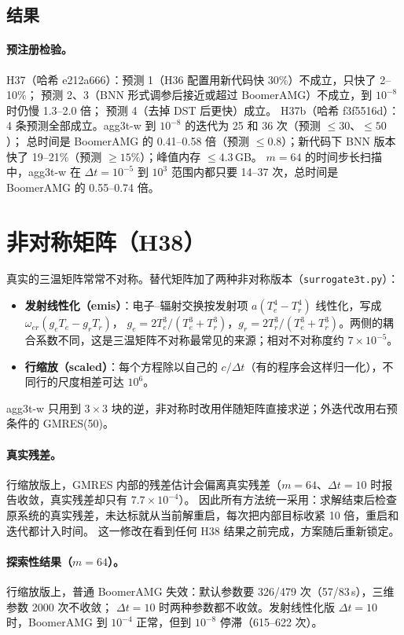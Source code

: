 \documentclass[11pt,a4paper]{ctexart}
\begin{document}
\subsection{结果}

\paragraph{预注册检验。}
H37（哈希 e212a666）：预测 1（H36 配置用新代码快 30\%）不成立，只快了 2--10\%；
预测 2、3（BNN 形式调参后接近或超过 BoomerAMG）不成立，到 $10^{-8}$ 时仍慢 1.3--2.0 倍；
预测 4（去掉 DST 后更快）成立。
H37b（哈希 f3f5516d）：4 条预测全部成立。agg3t-w 到 $10^{-8}$ 的迭代为 25 和 36 次（预测 $\le30$、$\le50$）；
总时间是 BoomerAMG 的 0.41--0.58 倍（预测 $\le0.8$）；新代码下 BNN 版本快了 19--21\%（预测 $\ge15\%$）；峰值内存 $\le4.3$\,GB。
$m=64$ 的时间步长扫描中，agg3t-w 在 $\Delta t=10^{-5}$ 到 $10^{3}$ 范围内都只要 14--37 次，总时间是 BoomerAMG 的 0.55--0.74 倍。

\section{非对称矩阵（H38）}
真实的三温矩阵常常不对称。替代矩阵加了两种非对称版本（\texttt{surrogate3t.py}）：
\begin{itemize}
\item \textbf{发射线性化（emis）}：电子--辐射交换按发射项 $a(T_e^4-T_r^4)$ 线性化，写成 $\omega_{er}(g_eT_e-g_rT_r)$，
$g_e=2T_e^3/(T_e^3+T_r^3)$，$g_r=2T_r^3/(T_e^3+T_r^3)$。两侧的耦合系数不同，这是三温矩阵不对称最常见的来源；相对不对称度约 $7\times10^{-5}$。
\item \textbf{行缩放（scaled）}：每个方程除以自己的 $c/\Delta t$（有的程序会这样归一化），不同行的尺度相差可达 $10^6$。
\end{itemize}
agg3t-w 只用到 $3\times3$ 块的逆，非对称时改用伴随矩阵直接求逆；外迭代改用右预条件的 GMRES(50)。

\paragraph{真实残差。}行缩放版上，GMRES 内部的残差估计会偏离真实残差（$m=64$、$\Delta t=10$ 时报告收敛，真实残差却只有 $7.7\times10^{-4}$）。
因此所有方法统一采用：求解结束后检查原系统的真实残差，未达标就从当前解重启，每次把内部目标收紧 10 倍，重启和迭代都计入时间。
这一修改在看到任何 H38 结果之前完成，方案随后重新锁定。

\paragraph{探索性结果（$m=64$）。}行缩放版上，普通 BoomerAMG 失效：默认参数要 326/479 次（57/83\,s），三维参数 2000 次不收敛；
$\Delta t=10$ 时两种参数都不收敛。发射线性化版 $\Delta t=10$ 时，BoomerAMG 到 $10^{-4}$ 正常，但到 $10^{-8}$ 停滞（615--622 次）。
\end{document}
